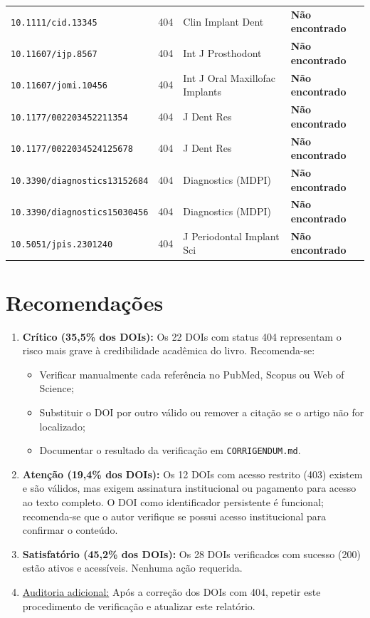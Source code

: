 \begin{longtable}{|p{3.5cm}|p{2cm}|p{6.5cm}|p{2cm}|}
\verb|10.1111/cid.13345| & 404 & Clin Implant Dent & \textbf{Não encontrado} \\
\verb|10.11607/ijp.8567| & 404 & Int J Prosthodont & \textbf{Não encontrado} \\
\verb|10.11607/jomi.10456| & 404 & Int J Oral Maxillofac Implants & \textbf{Não encontrado} \\
\verb|10.1177/002203452211354| & 404 & J Dent Res & \textbf{Não encontrado} \\
\verb|10.1177/0022034524125678| & 404 & J Dent Res & \textbf{Não encontrado} \\
\verb|10.3390/diagnostics13152684| & 404 & Diagnostics (MDPI) & \textbf{Não encontrado} \\
\verb|10.3390/diagnostics15030456| & 404 & Diagnostics (MDPI) & \textbf{Não encontrado} \\
\verb|10.5051/jpis.2301240| & 404 & J Periodontal Implant Sci & \textbf{Não encontrado} \\
\hline
\end{longtable}

\section{Recomendações}

\begin{enumerate}
  \item \textbf{Crítico (35,5\% dos DOIs):} Os 22 DOIs com status 404
        representam o risco mais grave à credibilidade acadêmica do livro.
        Recomenda-se:
        \begin{itemize}
          \item Verificar manualmente cada referência no PubMed, Scopus
                ou Web of Science;
          \item Substituir o DOI por outro válido ou remover a citação
                se o artigo não for localizado;
          \item Documentar o resultado da verificação em
                \texttt{CORRIGENDUM.md}.
        \end{itemize}
  \item \textbf{Atenção (19,4\% dos DOIs):} Os 12 DOIs com acesso
        restrito (403) existem e são válidos, mas exigem assinatura
        institucional ou pagamento para acesso ao texto completo. O
        DOI como identificador persistente é funcional; recomenda-se
        que o autor verifique se possui acesso institucional para
        confirmar o conteúdo.
  \item \textbf{Satisfatório (45,2\% dos DOIs):} Os 28 DOIs verificados
        com sucesso (200) estão ativos e acessíveis. Nenhuma ação
        requerida.
  \item \underline{Auditoria adicional:} Após a correção dos DOIs com
        404, repetir este procedimento de verificação e atualizar este
        relatório.
\end{enumerate}

